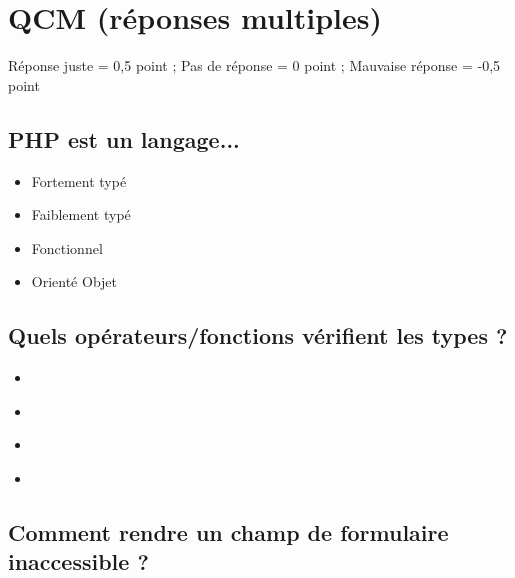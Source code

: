 \documentclass[11pt,a4paper]{article}
\begin{document}
\MakeExamTitle                   %


\section{QCM (réponses multiples)}

\medskip

Réponse juste = 0,5 point ; Pas de réponse = 0 point ; Mauvaise réponse = -0,5 point

\medskip

\subsection{PHP est un langage...}

\begin{itemize}
\item[\CaseCoche] Fortement typé\\
\item[\CaseCoche] Faiblement typé\\
\item[\CaseCoche] Fonctionnel\\
\item[\CaseCoche] Orienté Objet\\
\end{itemize}


\subsection{Quels opérateurs/fonctions vérifient les types ?}

\begin{itemize}
\item[\CaseCoche] \TTBF{==} \\
\item[\CaseCoche]  \\
\item[\CaseCoche]  \\
\item[\CaseCoche]  \\
\end{itemize}


\subsection{Comment rendre un champ de formulaire inaccessible ?}
\end{document}
